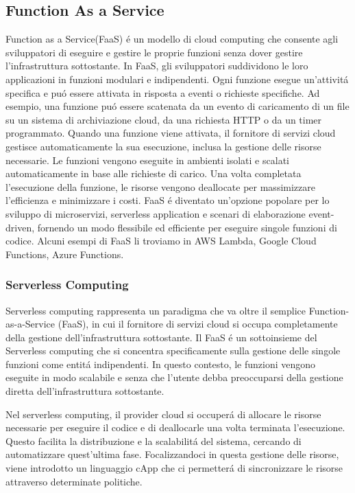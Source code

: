 \documentclass[../../main.tex]{subfiles}
\begin{document}
\subsection{Function As a  Service}
Function as a Service(FaaS) é un modello di cloud computing che consente agli sviluppatori di eseguire e gestire le proprie funzioni senza dover gestire l'infrastruttura sottostante.
In FaaS, gli sviluppatori suddividono le loro applicazioni in funzioni modulari e indipendenti. Ogni funzione esegue un'attivitá specifica e puó essere attivata in risposta a eventi o richieste specifiche. Ad esempio, una funzione puó essere scatenata da un evento di caricamento di un file su un sistema di archiviazione cloud, da una richiesta HTTP o da un timer programmato. Quando una funzione viene attivata, il fornitore di servizi cloud gestisce automaticamente la sua esecuzione, inclusa la gestione delle risorse necessarie. Le funzioni vengono eseguite in ambienti isolati e scalati automaticamente in base alle richieste di carico. Una volta completata l'esecuzione della funzione, le risorse vengono deallocate per massimizzare l'efficienza e minimizzare i costi.
FaaS é diventato un'opzione popolare per lo sviluppo di microservizi, serverless application e scenari di elaborazione event-driven, fornendo un modo flessibile ed efficiente per eseguire singole funzioni di codice.
Alcuni esempi di FaaS li troviamo in AWS Lambda, Google Cloud Functions, Azure Functions.

\subsubsection{Serverless Computing}
Serverless computing rappresenta un paradigma che va oltre il semplice Function-as-a-Service (FaaS), in cui il fornitore di servizi cloud si occupa completamente della gestione dell'infrastruttura sottostante. Il FaaS é un sottoinsieme del Serverless computing che si concentra specificamente sulla gestione delle singole funzioni come entitá indipendenti. In questo contesto, le funzioni vengono eseguite in modo scalabile e senza che l'utente debba preoccuparsi della gestione diretta dell'infrastruttura sottostante.
\autocite{amslaurea24930}

Nel serverless computing, il provider cloud si occuperá di allocare le risorse necessarie per eseguire il codice e di deallocarle una volta terminata l'esecuzione. Questo facilita la distribuzione e la scalabilitá del sistema, cercando di automatizzare quest'ultima fase.
Focalizzandoci in questa gestione delle risorse, viene introdotto un linguaggio cApp che ci permetterá di sincronizzare le risorse attraverso determinate politiche.
\end{document}
